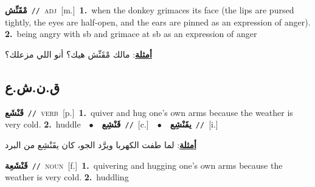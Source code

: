 \documentclass[10pt,a4paper,twoside]{article} %
\begin{document}
\begin{multicols}{2}
{\setlength\topsep{0pt}\textbf{\foreignlanguage{arabic}{مْقَنِّش}}\ {\color{gray}\texttt{//}\color{black}}\ \textsc{adj}\ [m.]\ \textbf{1.}~when the donkey grimaces its face (the lips are pursed tightly, the eyes are half-open, and the ears are pinned as an expression of anger).  \textbf{2.}~being angry with sb and grimace at sb as an expression of anger\  \begin{flushright}\color{gray}\foreignlanguage{arabic}{\textbf{\underline{\foreignlanguage{arabic}{أمثلة}}}: مالك مْقَنِّش هيك؟ أنو اللي مزعلك؟}\end{flushright}\color{black}} \vspace{2mm}

\vspace{-3mm}
\subsection*{\color{blue}\foreignlanguage{arabic}{ق.ن.ش.ع}\color{blue}{}} 

{\setlength\topsep{0pt}\textbf{\foreignlanguage{arabic}{قَنْشَع}}\ {\color{gray}\texttt{//}\color{black}}\ \textsc{verb}\ [p.]\ \textbf{1.}~quiver and hug one's own arms because the weather is very cold.  \textbf{2.}~huddle\ \ $\bullet$\ \ \setlength\topsep{0pt}\textbf{\foreignlanguage{arabic}{قَنْشِع}}\ {\color{gray}\texttt{//}\color{black}}\ [c.]\ \ $\bullet$\ \ \setlength\topsep{0pt}\textbf{\foreignlanguage{arabic}{يقَنْشِع}}\ {\color{gray}\texttt{//}\color{black}}\ [i.]\  \begin{flushright}\color{gray}\foreignlanguage{arabic}{\textbf{\underline{\foreignlanguage{arabic}{أمثلة}}}: لما طفت الكهربا ويرَّد الجو، كان يقَنْشِع من البرد}\end{flushright}\color{black}} \vspace{2mm}

{\setlength\topsep{0pt}\textbf{\foreignlanguage{arabic}{قَنْشَعِة}}\ {\color{gray}\texttt{//}\color{black}}\ \textsc{noun}\ [f.]\ \textbf{1.}~quivering and hugging one's own arms because the weather is very cold.  \textbf{2.}~huddling\ } \vspace{2mm}


\end{multicols}
\end{document}
